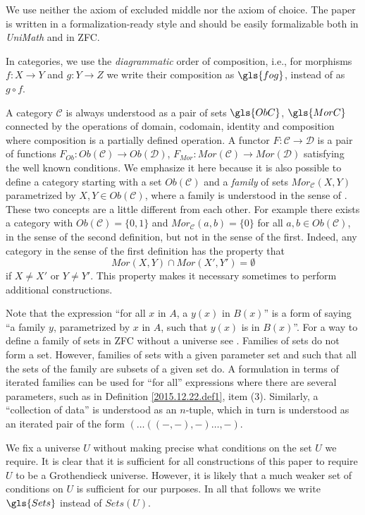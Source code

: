 \documentclass[onecolumn,12pt]{amsart}
\numberwithin{proposition}{subsection}
\newcommand{\sr}{\rightarrow}
\newcommand{\C}{{\mathcal C}}
\newcommand{\D}{{\mathcal D}}
\begin{document}
We use neither the axiom of excluded middle nor the axiom of choice. The paper
is written in a formalization-ready style and should be easily formalizable
both in {\em UniMath} and in ZFC.

In categories, we use the {\em diagrammatic} order of composition, i.e., for morphisms $f:X\sr Y$
and $g:Y\sr Z$ we write their composition as $\gls{fog}$, instead of as $g \circ f$.

A category $\C$ is always understood as a pair of sets $\gls{ObC}$, $\gls{MorC}$
connected by the operations of domain, codomain, identity and composition where
composition is a partially defined operation. A functor $F:\C\sr \D$ is a pair
of functions $F_{Ob}:Ob(\C)\sr Ob(\D)$, $F_{Mor}:Mor(\C)\sr Mor(\D)$ satisfying
the well known conditions. We emphasize it here because it is also possible to
define a category starting with a set $Ob(\C)$ and a {\em family} of sets
$Mor_{\C}(X,Y)$ parametrized by $X,Y\in Ob(\C)$, where a {family} is understood
in the sense of \cite[Remark 3.9]{fromunivwithPiI}. These two concepts are a
little different from each other. For example there exists a category with
$Ob(\C)=\{0,1\}$ and $Mor_{\C}(a,b)=\{0\}$ for all $a,b\in Ob(\C)$, in the
sense of the second definition, but not in the sense of the first. Indeed, any
category in the sense of the first definition has the property that
%
$$Mor(X,Y)\cap Mor(X',Y')=\emptyset$$
%
if $X\ne X'$ or $Y\ne Y'$. This property makes it necessary sometimes to
perform additional constructions.

Note that the expression ``for all $x$ in $A$, a $y(x)$ in $B(x)$'' is a form
of saying ``a family $y$, parametrized by $x$ in $A$, such that $y(x)$ is in
$B(x)$''. For a way to define a family of sets in ZFC without a universe
see \cite[Remark 3.9]{fromunivwithPiI}. Families of sets do not form a
set. However, families of sets with a given parameter set and such that all the
sets of the family are subsets of a given set do. A formulation in terms of
iterated families can be used for ``for all'' expressions where there are
several parameters, such as in Definition \ref{2015.12.22.def1}, item (3). Similarly, a
``collection of data'' is understood as an $n$-tuple, which in turn is understood as
an iterated pair of the form $(\dots((-,-),-)\dots,-)$.

We fix a universe $U$ without making precise what conditions on the set $U$ we
require. It is clear that it is sufficient for all constructions of this paper
to require $U$ to be a Grothendieck universe. However, it is likely that a much
weaker set of conditions on $U$ is sufficient for our purposes. In all that
follows we write $\gls{Sets}$ instead of $Sets(U)$.
\end{document}
